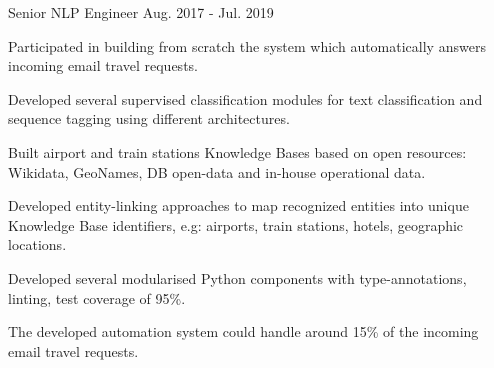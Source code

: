 \begin{cventries}
  \cventry
    {Senior NLP Engineer}
    {} %
    {} %
    {Aug. 2017 - Jul. 2019} %
    {
      \begin{cvitems}
		\item {Participated in building from scratch the system which automatically answers incoming email travel requests.}
		\item {Developed several supervised classification modules for text classification and sequence tagging using different architectures.}
		\item {Built airport and train stations Knowledge Bases based on open resources: Wikidata, GeoNames, DB open-data and in-house operational data.}
		\item {Developed entity-linking approaches to map recognized entities into unique Knowledge Base identifiers, e.g: airports, train stations, hotels, geographic locations.}
		\item {Developed several modularised Python components with type-annotations, linting, test coverage of 95\%.}
		\item {The developed automation system could handle around 15\% of the incoming email travel requests.}
        \end{cvitems}
 	}




\begin{comment}
  \cventry
    {Lead NLP Engineer} %
    {Comtravo GmbH} %
    {Berlin, Germany} %
    {Aug. 2017 - Apr. 2022} %
	{
      \begin{cvitems} %
		\item {Joined as an NLP Engineer in August 2017, was promoted to Senior NLP Engineer in July 2019, and in June 2021 to Lead NLP Engineer.}
        \item {Led a team of 3 developers + 4 annotators, working on the system that automatically answers incoming email travel requests and assists travel agents in handling them. Coordinating development tasks based on system performance and feature requests.}
        \item {Trained, evaluated and improved different models for text classification and fine-grained NER, increasing the performance of identifying specific booking requests and performing information extraction to automatically fulfil booking requests.}
		\item {Developed algorithms to map input text into unique Knowledge Base identifiers, e.g: airports, train stations, hotels, geographic locations.}		
      \end{cvitems}
    }
\end{comment}





\end{cventries}
